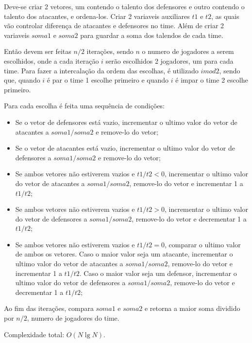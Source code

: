 Deve-se criar 2 vetores, um contendo o talento dos defensores e outro contendo o talento dos atacantes, e ordena-los.
Criar 2 variaveis auxiliares $t1$ e $t2$, as quais vão controlar diferença de atacantes e defensores no time. 
Além de criar 2 variaveis $soma1$ e $soma2$ para guardar a soma dos talendos de cada time.

Então devem ser feitas $n/2$ iterações, sendo $n$ o numero de jogadores a serem escolhidos, onde a cada
iteração $i$ serão escolhidos 2 jogadores, um para cada time. Para fazer a intercalação da ordem
das escolhas, é utilizado $i mod 2$, sendo que, quando $i$ é par o time 1 escolhe primeiro e quando $i$
é impar o time 2 escolhe primeiro.

Para cada escolha é feita uma sequência de condições:
\begin{itemize}
    \item Se o vetor de defensores está vazio, incrementar o ultimo valor do vetor
    de atacantes a $soma1/soma2$ e remove-lo do vetor;
    \item Se o vetor de atacantes está vazio, incrementar o ultimo valor do vetor
    de defensores a $soma1/soma2$ e remove-lo do vetor;
    \item Se ambos vetores não estiverem vazios e $t1/t2 < 0$, incrementar o ultimo valor do vetor
    de atacantes a $soma1/soma2$, remove-lo do vetor e incrementar 1 a $t1/t2$;
    \item Se ambos vetores não estiverem vazios e $t1/t2 > 0$, incrementar o ultimo valor do vetor
    de defensores a $soma1/soma2$, remove-lo do vetor e decrementar 1 a $t1/t2$;
    \item Se ambos vetores não estiverem vazios e $t1/t2 = 0$, comparar o ultimo valor de ambos
    os vetores. Caso o maior valor seja um atacante, incrementar o ultimo valor do vetor
    de atacantes a $soma1/soma2$, remove-lo do vetor e incrementar 1 a $t1/t2$. Caso o maior valor
    seja um defensor, incrementar o ultimo valor do vetor de defensores a $soma1/soma2$, remove-lo 
    do vetor e decrementar 1 a $t1/t2$;
\end{itemize}

Ao fim das iterações, compara $soma1$ e $soma2$ e retorna a maior soma dividido por $n/2$, numero de
jogadores do time.

Complexidade total: $O(N\lg N)$.